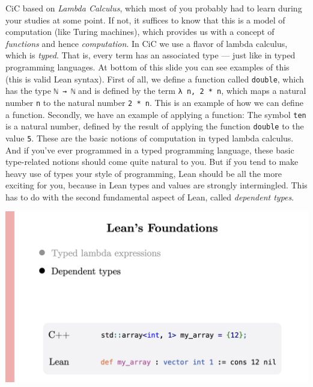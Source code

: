 \documentclass{article}
\begin{document}
CiC based on \emph{Lambda Calculus}, which most of you probably had to
learn during your studies at some point. If not, it suffices to know
that this is a model of computation (like Turing machines), which
provides us with a concept of \emph{functions} and hence
\emph{computation}. In CiC we use a flavor of lambda calculus, which is
\emph{typed}. That is, every term has an associated type --- just like in
typed programming languages. At bottom of this slide you can see
examples of this (this is valid Lean syntax). First of all, we define a
function called \lstinline{double}, which has the type \lstinline{ℕ → ℕ} and
is defined by the term \lstinline{λ n, 2 * n}, which maps a natural
number \lstinline{n} to the natural number \lstinline{2 * n}. This is an
example of how we can define a function. Secondly, we have an example of
applying a function: The symbol \lstinline{ten} is a natural number,
defined by the result of applying the function \lstinline{double} to the
value \lstinline{5}. These are the basic notions of computation in typed
lambda calculus. And if you've ever programmed in a typed programming
language, these basic type-related notions should come quite natural to
you. But if you tend to make heavy use of types your style of
programming, Lean should be all the more exciting for you, because in
Lean types and values are strongly intermingled. This has to do with the
second fundamental aspect of Lean, called \emph{dependent types}.

\begin{center}
  \includegraphics[width=\columnwidth]{Slides/Slide 5.jpeg}
\end{center}
\end{document}
